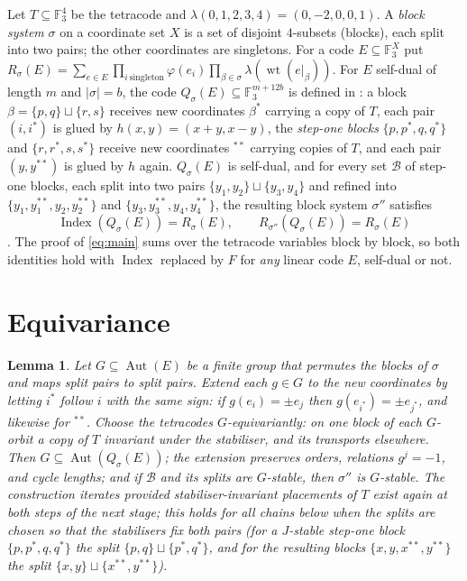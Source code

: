\documentclass[11pt]{amsart}
\newtheorem{lemma}[theorem]{Lemma}
\theoremstyle{definition}
\newcommand{\F}{\mathbb{F}_3}
\newcommand{\wt}{\operatorname{wt}}
\newcommand{\Index}{\operatorname{Index}}
\newcommand{\Aut}{\operatorname{Aut}}
\begin{document}
Let $T\subseteq\F^4$ be the tetracode and $\lambda(0,1,2,3,4)=(0,-2,0,0,1)$. A \emph{block
system} $\sigma$ on a coordinate set $X$ is a set of disjoint $4$-subsets (blocks), each split
into two pairs; the other coordinates are singletons. For a code $E\subseteq\F^X$ put
$R_\sigma(E)=\sum_{e\in E}\prod_{i\ \mathrm{singleton}}\varphi(e_i)\prod_{\beta\in\sigma}
\lambda(\wt(e|_\beta))$. For $E$ self-dual of length $m$ and $|\sigma|=b$, the code
$Q_\sigma(E)\subseteq\F^{m+12b}$ is defined in \cite[Def.~6]{BR}: a block $\beta=\{p,q\}\sqcup\{r,s\}$
receives new coordinates $\beta^*$ carrying a copy of $T$, each pair $(i,i^*)$ is glued by
$h(x,y)=(x+y,x-y)$, the \emph{step-one blocks} $\{p,p^*,q,q^*\}$ and $\{r,r^*,s,s^*\}$ receive new
coordinates ${}^{**}$ carrying copies of $T$, and each pair $(y,y^{**})$ is glued by $h$ again.
$Q_\sigma(E)$ is self-dual, and for every set $\mathcal B$ of step-one blocks, each split into two
pairs $\{y_1,y_2\}\sqcup\{y_3,y_4\}$ and refined into $\{y_1,y_1^{**},y_2,y_2^{**}\}$ and
$\{y_3,y_3^{**},y_4,y_4^{**}\}$, the resulting block system $\sigma''$ satisfies
\begin{equation}\label{eq:main}
\Index(Q_\sigma(E))=R_\sigma(E),\qquad R_{\sigma''}(Q_\sigma(E))=R_\sigma(E)
\end{equation}
\cite[Lemma~8]{BR}. The proof of \eqref{eq:main} sums over the tetracode variables block by
block, so both identities hold with $\Index$ replaced by $F$ for \emph{any} linear code $E$,
self-dual or not.

\section{Equivariance}\label{sec:eq}

\begin{lemma}\label{lem:eq}
Let $G\subseteq\Aut(E)$ be a finite group that permutes the blocks of $\sigma$ and maps split
pairs to split pairs. Extend each $g\in G$ to the new coordinates by letting $i^*$ follow $i$ with
the same sign: if $g(e_i)=\pm e_{j}$ then $g(e_{i^*})=\pm e_{j^*}$, and likewise for ${}^{**}$.
Choose the tetracodes $G$-equivariantly: on one block of each $G$-orbit a copy of $T$ invariant
under the stabiliser, and its transports elsewhere. Then $G\subseteq\Aut(Q_\sigma(E))$; the
extension preserves orders, relations $g^j=-1$, and cycle lengths; and if $\mathcal B$ and its
splits are $G$-stable, then $\sigma''$ is $G$-stable. The construction iterates provided
stabiliser-invariant placements of $T$ exist again at both steps of the next stage; this holds for
all chains below when the splits are chosen so that the stabilisers fix both pairs (for a $J$-stable
step-one block $\{p,p^*,q,q^*\}$ the split $\{p,q\}\sqcup\{p^*,q^*\}$, and for the resulting blocks
$\{x,y,x^{**},y^{**}\}$ the split $\{x,y\}\sqcup\{x^{**},y^{**}\}$).
\end{lemma}
\end{document}
